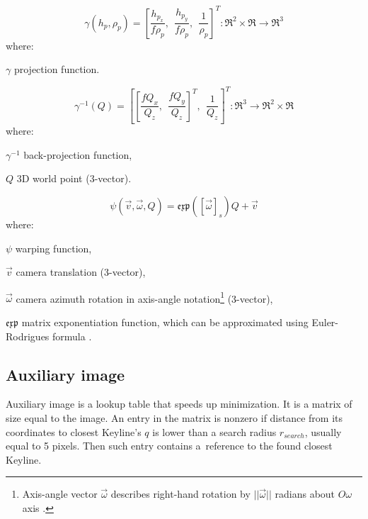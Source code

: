 \begin{equation}
\gamma(h_{p}, \rho_{p}) = \left [\frac{h_{p_x}}{f\rho_{p}},\ \ \frac{h_{p_y}}{f\rho_{p}},\ \ \frac{1}{\rho_{p}}\right ]^T: \Re^2 \times \Re \rightarrow \Re^3
\label{eq:gamma}
\end{equation}
where:
\begin{eqwhere}[2cm]
	\item[$\gamma$] projection function.
\end{eqwhere}

\begin{equation}
\gamma^{-1}(Q) = \left [ \left [ \frac{fQ_x}{Q_z},\ \ \frac{fQ_y}{Q_z} \right]^T,\ \ \frac{1}{Q_{z}}\right ]^T: \Re^3 \rightarrow  \Re^2 \times \Re
\label{eq:gammainv}
\end{equation}
where:
\begin{eqwhere}[2cm]
	\item[$\gamma^{-1}$] back-projection function,
	\item[$Q$] 3D world point (3-vector).
\end{eqwhere}

\begin{equation}
\psi(\vec{v}, \vec{\omega}, Q) = \mathfrak{exp} \left ( \left[ \vec{\omega} \right ]_{s} \right ) Q + \vec{v}
\label{eq:rototr}
\end{equation}
where:
\begin{eqwhere}[2cm]
	\item[$\psi$] warping function,
	\item[$\vec{v}$] camera translation (3-vector),
	\item[$\vec{\omega}$] camera azimuth rotation in axis-angle notation\footnote{Axis-angle vector $\vec{\omega}$ describes right-hand rotation by $||\vec{\omega}||$ radians about $O\omega$ axis \cite{hartley2003multiple} \cite{blanco2010tutorial}.} (3-vector),
	\item[$ \mathfrak{exp}$] matrix exponentiation function, which can be approximated using Euler-Rodrigues formula \cite{opencv}.
\end{eqwhere}


\subsection{Auxiliary image}
\label{sec:aux}

Auxiliary image is a lookup table that speeds up minimization. It is a matrix of size equal to the image. An entry in the matrix is nonzero if distance from its coordinates to closest Keyline's $q$ is lower than a search radius $r_{search}$, usually equal to 5 pixels. Then such entry contains a~reference to the found closest Keyline.

